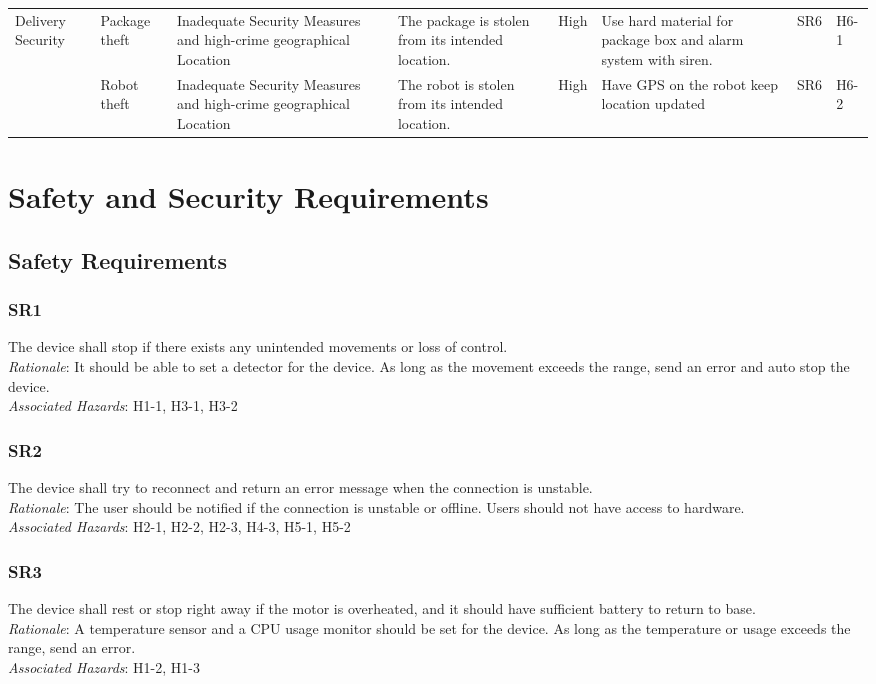 \documentclass{article}
\begin{document}
\begin{center}
\begin{longtable}{|p{2.5cm}|p{2.5cm}|p{3cm}|p{3cm}|p{1.25cm}|p{2.5cm}|p{0.75cm}|p{0.75cm}|}
    \hline

    Delivery Security & Package theft & Inadequate Security Measures and high-crime geographical Location & The package is stolen from its intended location. & High & Use hard material for package box and alarm system with siren. & SR6 & H6-1 \\ \cline{2-8}
    & Robot theft & Inadequate Security Measures and high-crime geographical Location & The robot is stolen from its intended location. & High & Have GPS on the robot keep location updated & SR6 & H6-2 \\ \cline{2-8}
    
    \hline
\end{longtable}
\end{center}

\newpage

\section{Safety and Security Requirements}
\subsection{Safety Requirements}
\subsubsection{SR1}
The device shall stop if there exists any unintended movements or loss of control.\\
\textit{Rationale}: It should be able to set a detector for the device. As long as the movement exceeds the range, send an error and auto stop the device.\\
\textit{Associated Hazards}: H1-1, H3-1, H3-2
\subsubsection{SR2}
The device shall try to reconnect and return an error message when the connection is unstable.\\
\textit{Rationale}: The user should be notified if the connection is unstable or offline. Users should not have access to hardware.\\
\textit{Associated Hazards}: H2-1, H2-2, H2-3, H4-3, H5-1, H5-2
\subsubsection{SR3}
The device shall rest or stop right away if the motor is overheated, and it should have sufficient battery to return to base.\\
\textit{Rationale}: A temperature sensor and a CPU usage monitor should be set for the device. As long as the temperature or usage exceeds the range, send an error.\\
\textit{Associated Hazards}: H1-2, H1-3
\end{document}
